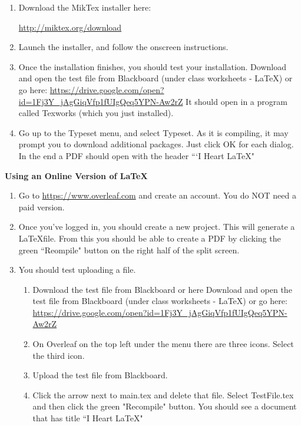 \documentclass[a4paper,12pt]{letter}
\begin{document}
\begin{enumerate}
\item Download the MikTex installer here: 
\begin{center}
\url{http://miktex.org/download}
\end{center}
\item Launch the installer, and follow the onscreen instructions.  
\item Once the installation finishes, you should test your installation.  Download and open the test file from Blackboard (under class worksheets - LaTeX) or go here: \url{https://drive.google.com/open?id=1Fj3Y_jAgGiqVfp1fUIgQeq5YPN-Aw2rZ}
It should open in a program called Texworks (which you just installed).  
\item Go up to the Typeset menu, and select Typeset.  As it is compiling, it may prompt you to download additional packages.  Just click OK for each dialog.  In the end a PDF should open with the header ```I Heart \LaTeX"
\end{enumerate}


\newpage

\begin{center}
{\bf Using an Online Version of \LaTeX}
\end{center}

\begin{enumerate}
\item Go to \url{https://www.overleaf.com} and create an account. You do NOT need a paid version.
\item  Once you've logged in, you should create a new project.  This will generate a \LaTeX file.  From this you should be able to create a PDF by clicking the green ``Reompile" button on the right half of the split screen.
\item You should test uploading a file. 
	\begin{enumerate}
	\item Download the test file from Blackboard or here Download and open the test file from Blackboard (under class worksheets - LaTeX) or go here: \url{https://drive.google.com/open?id=1Fj3Y_jAgGiqVfp1fUIgQeq5YPN-Aw2rZ}
	\item On Overleaf on the top left under the menu there are three icons. Select the third icon.
	\item Upload the test file from Blackboard.
	\item Click the arrow next to main.tex and delete that file. Select TestFile.tex and then click the green "Recompile" button. You should see a document that has title ``I Heart \LaTeX"
	\end{enumerate}
\end{enumerate}
\end{document}
